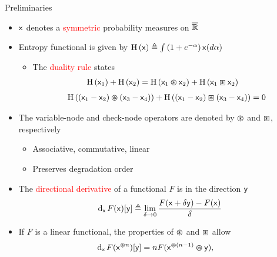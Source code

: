 \documentclass{beamer}
\newlength{\onecolwid}
\begin{document}
\begin{columns}[t]
\begin{column}{\onecolwid}
    \vspace{2cm}
    \begin{block}{\Large Preliminaries}
      \begin{itemize}
      \item\vspace{0.75cm} $\mathsf{x}$ denotes a \textcolor{red}{symmetric} probability measures on $\overline{\mathbb{R}}$
      \item\vspace{0.75cm} Entropy functional is given by $\mathrm{H} \left( \mathsf{x} \right) \triangleq \int \left( 1+e^{-\alpha} \right) \mathsf{x}(d\alpha)$
        \vspace{0.75cm}
        \begin{itemize}
        \item The \textcolor{red}{duality rule} states
          \begin{align*}
            \mathrm{H} \left( \mathsf{x}_1 \right) + \mathrm{H} \left( \mathsf{x}_2 \right) &= \mathrm{H} \left( \mathsf{x}_1 \varoast \mathsf{x}_2 \right) + \mathrm{H} \left( \mathsf{x}_1 \boxast \mathsf{x}_2 \right)
          \end{align*}
          \begin{align*}
            \mathrm{H} \left( (\mathsf{x}_1 - \mathsf{x}_2) \varoast (\mathsf{x}_3 - \mathsf{x}_4)  \right) + \mathrm{H} \left( (\mathsf{x}_1 - \mathsf{x}_2) \boxast (\mathsf{x}_3 - \mathsf{x}_4)  \right) = 0
          \end{align*}
        \end{itemize}
        
      \item\vspace{0.75cm} The variable-node and check-node operators are denoted by $\varoast$ and $\boxast$, respectively
        \begin{itemize}
          \vspace{0.5cm} \item Associative, commutative, linear
          \vspace{0.5cm} \item Preserves degradation order
        \end{itemize}
        
      \item\vspace{0.75cm} The \textcolor{red}{directional derivative} of a functional $F$ is in the direction $\mathsf{y}$
        \begin{align*}
          \mathrm{d}_{ \mathsf{x} }\hspace{0.05cm} F(\mathsf{x})[\mathsf{y}] \triangleq \lim_{\delta \rightarrow 0} \frac{F(\mathsf{x} + \delta \mathsf{y} ) - F(\mathsf{x})}{\delta} 
        \end{align*}
        
      \item\vspace{0.75cm} If $F$ is a linear functional, the properties of $\varoast$ and $\boxast$ allow
        \begin{align*}
          \mathrm{d}_{ \mathsf{x} }\hspace{0.05cm} F(\mathsf{x}^{\varoast n})[\mathsf{y}] &= n F( \mathsf{x}^{\varoast (n-1)} \varoast \mathsf{y} ) ,
        \end{align*}
      \end{itemize}
    \end{block}
  \end{column}


\end{columns}
\end{document}
